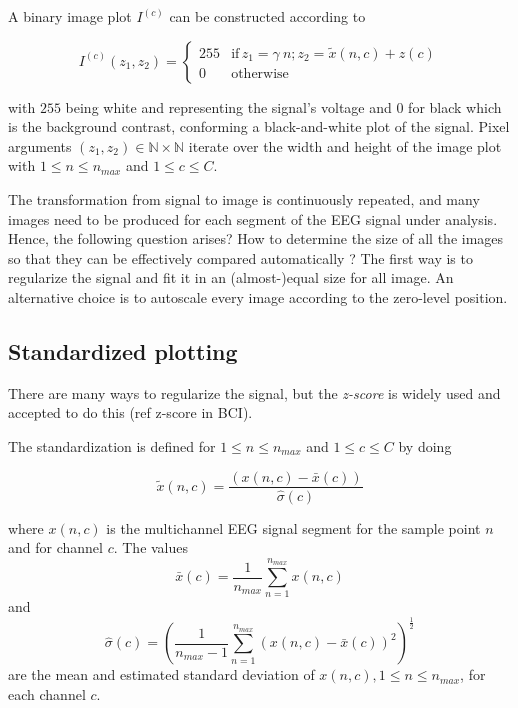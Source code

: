 A binary image plot $I^{(c)}$ can be constructed according to

\begin{equation}
I^{(c)}(z_1,z_2) = \left\{ \begin{array}{rl}
255 & \text{if} \,  z_1 = \gamma \  n; \! z_2 = \tilde{x}(n,c) + z(c) \\
0   & \mbox{otherwise}
\end{array}\right.
\label{eq:images}
\end{equation}

\noindent with $255$ being white and representing the signal's voltage and $0$ for black which is the background contrast, conforming a black-and-white plot of the signal.  Pixel arguments $ (z_1,z_2) \in \mathbb{N} \times \mathbb{N}$ iterate over the width and height of the image plot with $1 \leq n \leq n_{max}$ and $1 \leq c \leq C$.  

The transformation from signal to image is continuously repeated, and many images need to be produced for each segment of the EEG signal under analysis. Hence, the following question arises?  How to determine the size of all the images so that they can be effectively compared automatically ?  The first way is to regularize the signal and fit it in an (almost-)equal size for all image.  An alternative choice is to autoscale every image according to the zero-level position.

\subsection{Standardized plotting}

There are many ways to regularize the signal, but the \textit{z-score} is widely used and accepted to do this (ref z-score in BCI).

The standardization is defined for  $1 \leq n \leq n_{max}$ and $1 \leq c \leq C$ by doing

\begin{equation}
\tilde{x}(n,c) =  \frac{( x(n,c) - \bar{x}(c)  )}{ \hat{\sigma}(c) } 
\label{eq:standarizedaverages}
\end{equation}

\noindent  where $ x(n,c) $ is the multichannel EEG signal segment for the sample point $n$ and for channel $c$. The values $$\bar{x}(c) =\frac{1}{n_{max}}\sum_{n=1}^{n_{max}}x(n,c)$$ and $$ \hat{\sigma}(c) = (\frac{1}{n_{max}-1}\sum_{n=1}^{n_{max}}(x(n,c)-\bar{x}(c))^2 )^{\frac{1}{2}}$$ are the mean and estimated standard deviation of $x(n,c), 1 \leq n \leq n_{max}$, for each channel $c$.

